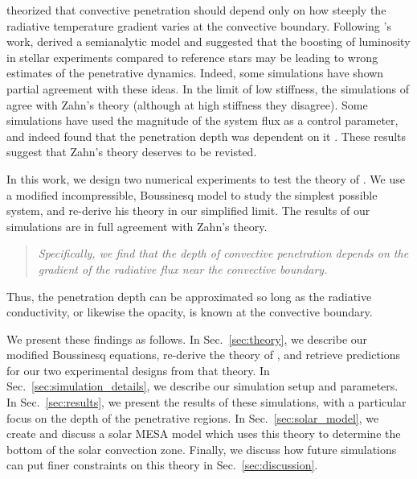 \documentclass{aastex631}
\begin{document}
\citet{zahn1991} theorized that convective penetration should depend only on how steeply the radiative temperature gradient varies at the convective boundary.
Following \citet{zahn1991}'s work, \citet{rempel2004} derived a semianalytic model and suggested that the boosting of luminosity in stellar experiments compared to reference stars may be leading to wrong estimates of the penetrative dynamics.
Indeed, some simulations have shown partial agreement with these ideas.
In the limit of low stiffness, the simulations of \citet{hurlburt_etal_1994, rogers_etal_2006} agree with Zahn's theory (although at high stiffness they disagree).
Some simulations have used the magnitude of the system flux as a control parameter, and indeed found that the penetration depth was dependent on it \citep{singh_etal_1998, hotta2017, kapyla2019}.
These results suggest that Zahn's theory deserves to be revisted.

In this work, we design two numerical experiments to test the theory of \citet{zahn1991}.
We use a modified incompressible, Boussinesq model to study the simplest possible system, and re-derive his theory in our simplified limit.
The results of our simulations are in full agreement with Zahn's theory.
\begin{quote}
\emph{
Specifically, we find that the depth of convective penetration depends on the gradient of the radiative flux near the convective boundary.
}
\end{quote}
Thus, the penetration depth can be approximated so long as the radiative conductivity, or likewise the opacity, is known at the convective boundary.

We present these findings as follows.
In Sec.~\ref{sec:theory}, we describe our modified Boussinesq equations, re-derive the theory of \citet{zahn1991}, and retrieve predictions for our two experimental designs from that theory.
In Sec.~\ref{sec:simulation_details}, we describe our simulation setup and parameters.
In Sec.~\ref{sec:results}, we present the results of these simulations, with a particular focus on the depth of the penetrative regions.
In Sec.~\ref{sec:solar_model}, we create and discuss a solar MESA model which uses this theory to determine the bottom of the solar convection zone.
Finally, we discuss how future simulations can put finer constraints on this theory in Sec.~\ref{sec:discussion}.
\end{document}
